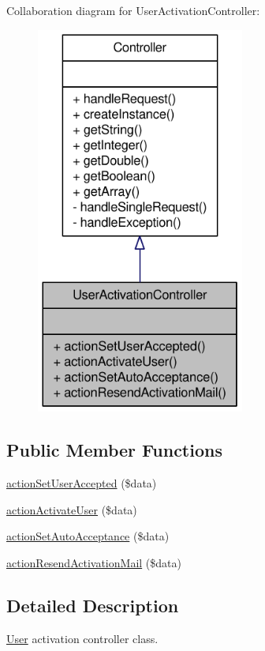 Collaboration diagram for UserActivationController:\nopagebreak
\begin{figure}[H]
\begin{center}
\leavevmode
\includegraphics[width=194pt]{classUserActivationController__coll__graph}
\end{center}
\end{figure}
\subsection*{Public Member Functions}
\begin{DoxyCompactItemize}
\item 
\hyperlink{classUserActivationController_a6516a31d5f6c0f31f735dd75c5cb956b}{actionSetUserAccepted} (\$data)
\item 
\hyperlink{classUserActivationController_a7d2da0a8372cbc230a473e49a4bf8ed4}{actionActivateUser} (\$data)
\item 
\hyperlink{classUserActivationController_af4bb5616883b5350ba785d697446f92d}{actionSetAutoAcceptance} (\$data)
\item 
\hyperlink{classUserActivationController_a7f666fc7c3367c341971926eddf45761}{actionResendActivationMail} (\$data)
\end{DoxyCompactItemize}


\subsection{Detailed Description}
\hyperlink{classUser}{User} activation controller class. 

